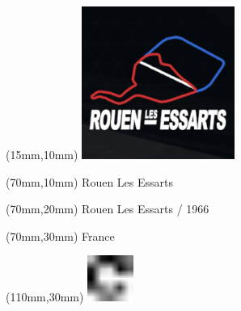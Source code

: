 \null\newpage
\begin{textblock*}{50mm}(15mm,10mm)%
\includegraphics[width=50mm]{LG/ROUE.png}
\end{textblock*}
\begin{textblock*}{130mm}(70mm,10mm)%
{\fontsize{20}{20}\selectfont Rouen Les Essarts}\\
\end{textblock*}
\begin{textblock*}{120mm}(70mm,20mm)%
{\fontsize{16}{16}\selectfont Rouen Les Essarts / 1966}\\
\end{textblock*}
\begin{textblock*}{120mm}(70mm,30mm)%
{\fontsize{12}{12}\selectfont France}
\end{textblock*}
\begin{textblock*}{30mm}(110mm,30mm)%
\centering
\includegraphics[height=15mm]{icons/fa-rotate-right.pdf}
\end{textblock*}
